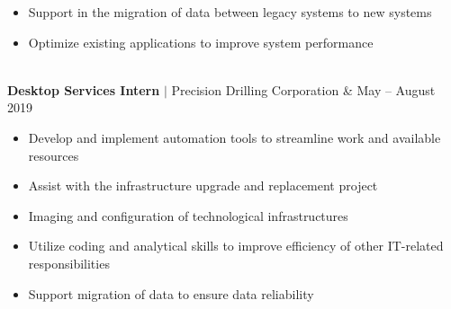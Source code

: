 \documentclass[11pt]{article}
\newenvironment{compactList}
{
  \begin{itemize}
    \setlength{\itemsep}{0pt}
    \setlength{\parskip}{0pt}
}
{\end{itemize}}
\begin{document}
\begin{tabularx}{\textwidth\setlength{\extrarowheight}{5pt}}
{\begin{minipage}{0.85\paperwidth}
\begin{compactList}
        \item Support in the migration of data between legacy systems to new systems
        \item Optimize existing applications to improve system performance
      \end{compactList}
    \end{minipage}
  }
  \\
  \textbf{Desktop Services Intern} $\vert$ Precision Drilling Corporation & May – August 2019      \\
  {
    \begin{minipage}{0.85\paperwidth}
      \begin{compactList}
        \item Develop and implement automation tools to streamline work and available resources
        \item Assist with the infrastructure upgrade and replacement project
        \item Imaging and configuration of technological infrastructures
        \item Utilize coding and analytical skills to improve efficiency of other IT-related responsibilities
        \item Support migration of data to ensure data reliability
      \end{compactList}
    \end{minipage}
  }
\end{tabularx}
\vspace{-10pt}
\end{document}
